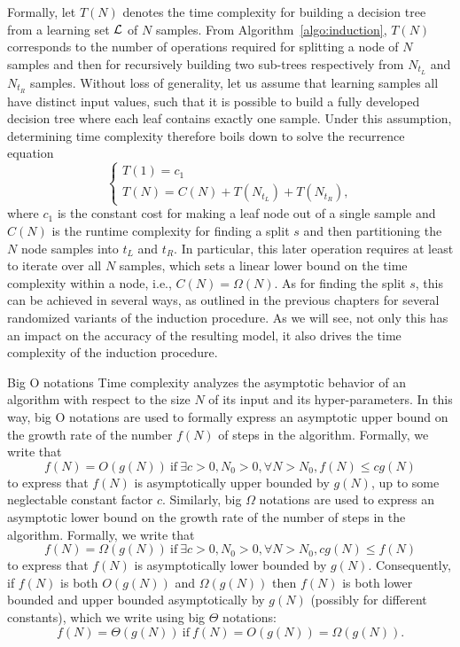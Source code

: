 Formally, let $T(N)$ denotes the time complexity for building a decision tree
from a learning set ${\cal L}$ of $N$ samples. From
Algorithm~\ref{algo:induction}, $T(N)$ corresponds to the number of operations
required for splitting a node of $N$ samples and then for recursively building
two sub-trees respectively from $N_{t_L}$ and $N_{t_R}$ samples. Without loss
of generality, let us assume that learning samples all have distinct input
values, such that it is possible to build a fully developed decision tree where
each leaf contains exactly one sample. Under this assumption, determining time
complexity therefore boils down to solve the recurrence equation
\begin{equation}\label{eqn:complexity:rec}
\begin{cases}
T(1) = c_1 \\
T(N) = C(N) + T(N_{t_L}) + T(N_{t_R}),
\end{cases}
\end{equation}
where $c_1$ is the constant cost for making a leaf node out of a single sample and $C(N)$\label{ntn:cN} is the runtime complexity for finding a split $s$ and then partitioning the $N$ node samples
into  ${t_L}$ and ${t_R}$. In particular, this later operation
requires at least to iterate over all $N$ samples, which sets a linear lower
bound on the time complexity within a node, i.e., $C(N)=\Omega(N)$. As for finding
the split $s$, this can be achieved in several ways, as outlined in the
previous chapters  for several randomized variants of the induction procedure.
As we will see, not only this has an impact on the accuracy of the resulting
model, it also drives the time complexity of the induction procedure.

\begin{remark}{Big O notations}
Time complexity analyzes the asymptotic behavior of an algorithm
with respect to the size $N$ of its input and its hyper-parameters. In this way,
big O notations are used to formally express an asymptotic upper bound on the
growth rate of the number $f(N)$ of steps in the algorithm. Formally,
we write that
\begin{equation}
f(N) =  O(g(N)) \ \text{if}\ \exists c > 0, N_0 > 0, \forall N > N_0, f(N) \leq c g(N)
\end{equation}
to express that  $f(N)$ is asymptotically upper bounded by $g(N)$, up to some neglectable constant factor $c$.
Similarly, big $\Omega$ notations are used to express an asymptotic lower
bound on the growth rate of the number of steps in the algorithm. Formally,
we write that
\begin{equation}
f(N) =  \Omega(g(N)) \ \text{if}\ \exists c > 0, N_0 > 0, \forall N > N_0,  c g(N) \leq f(N)
\end{equation}
to express that $f(N)$ is asymptotically lower bounded by $g(N)$.
Consequently, if $f(N)$ is both $O(g(N))$ and $\Omega(g(N))$ then $f(N)$ is
both lower bounded and upper bounded asymptotically by $g(N)$ (possibly for different constants),
which we write using big $\Theta$ notations:
\begin{equation}
f(N) = \Theta(g(N)) \ \text{if}\  f(N) =  O(g(N)) = \Omega(g(N)).
\end{equation}
\end{remark}

